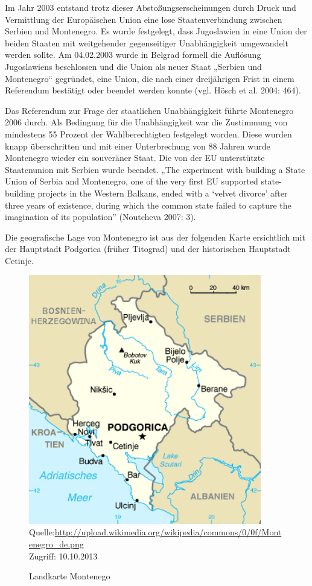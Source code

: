 Im Jahr 2003 entstand trotz dieser Abstoßungserscheinungen durch Druck und Vermittlung der Europäischen Union eine lose Staatenverbindung zwischen Serbien und Montenegro. Es wurde festgelegt, dass Jugoslawien in eine Union der beiden Staaten mit weitgehender gegenseitiger Unabhängigkeit umgewandelt werden sollte. Am 04.02.2003 wurde in Belgrad formell die Auflösung Jugoslawiens beschlossen und die Union als neuer Staat „Serbien und Montenegro“ gegründet, eine Union, die nach einer dreijährigen Frist in einem Referendum bestätigt oder beendet werden konnte (vgl. Hösch et al. 2004: 464).\par
Das Referendum zur Frage der staatlichen Unabhängigkeit führte Montenegro 2006 durch. Als Bedingung für die Unabhängigkeit war die Zustimmung von mindestens 55 Prozent der Wahlberechtigten festgelegt worden. Diese wurden knapp überschritten und mit einer Unterbrechung von 88 Jahren wurde Montenegro wieder ein souveräner Staat. Die von der EU unterstützte Staatenunion mit Serbien wurde beendet. „The experiment with building a State Union of Serbia and Montenegro, one of the very first EU supported state-building projects in the Western Balkans, ended with a ‘velvet divorce’ after three years of existence, during which the common state failed to capture the imagination of its population” (Noutcheva 2007: 3).\par
Die geografische Lage von Montenegro ist aus der folgenden Karte ersichtlich mit der Hauptstadt Podgorica (früher Titograd) und der historischen Hauptstadt Cetinje.
\begin{figure}[H]
  \centering
   \caption{Landkarte Montenego}
  \includegraphics[width=4in]{Material/Montenegro_de}\\
  \scriptsize{Quelle:\url{http://upload.wikimedia.org/wikipedia/commons/0/0f/Montenegro_de.png}\\ Zugriff: 10.10.2013}
\end{figure}

